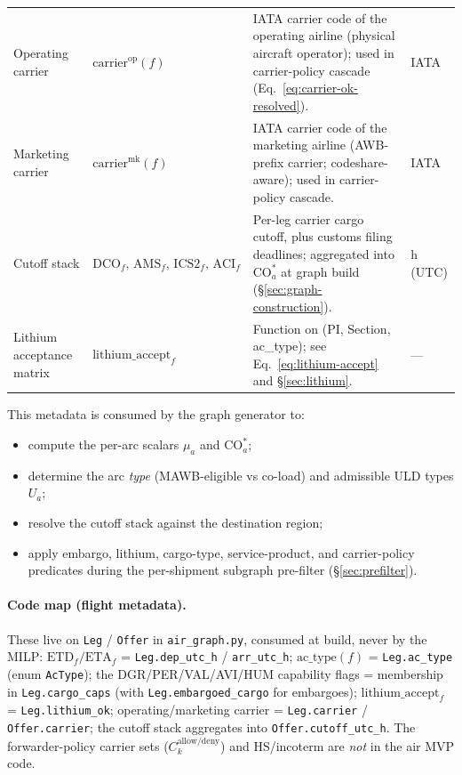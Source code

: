\documentclass[11pt,a4paper]{article}
\theoremstyle{definition}
\begin{document}
\begin{table}[H]
\begin{tabular}{p{2.8cm}p{2.5cm}p{7cm}p{1.5cm}}
Operating carrier & $\text{carrier}^{\text{op}}(f)$ & IATA carrier code of the operating airline (physical aircraft operator); used in carrier-policy cascade (Eq.~\ref{eq:carrier-ok-resolved}). & IATA \\
Marketing carrier & $\text{carrier}^{\text{mk}}(f)$ & IATA carrier code of the marketing airline (AWB-prefix carrier; codeshare-aware); used in carrier-policy cascade. & IATA \\
Cutoff stack & $\text{DCO}_f,\, \text{AMS}_f,\, \text{ICS2}_f,\, \text{ACI}_f$ & Per-leg carrier cargo cutoff, plus customs filing deadlines; aggregated into $\text{CO}_a^*$ at graph build (\S\ref{sec:graph-construction}). & h (UTC) \\
Lithium acceptance matrix & $\text{lithium\_accept}_f$ & Function on (PI, Section, ac\_type); see Eq.~\ref{eq:lithium-accept} and \S\ref{sec:lithium}. & --- \\
\bottomrule
\end{tabular}
\end{table}
This metadata is consumed by the graph generator to:
\begin{itemize}[noitemsep]
  \item compute the per-arc scalars $\mu_a$ and $\text{CO}_a^*$;
  \item determine the arc \emph{type} (MAWB-eligible vs co-load) and admissible
        ULD types $U_a$;
  \item resolve the cutoff stack against the destination region;
  \item apply embargo, lithium, cargo-type, service-product, and
        carrier-policy predicates during the per-shipment subgraph pre-filter
        (\S\ref{sec:prefilter}).
\end{itemize}

\paragraph{Code map (flight metadata).} These live on \texttt{Leg} / \texttt{Offer} in
\texttt{air\_graph.py}, consumed at build, never by the MILP: $\text{ETD}_f/\text{ETA}_f$ =
\texttt{Leg.dep\_utc\_h} / \texttt{arr\_utc\_h}; $\text{ac\_type}(f)$ = \texttt{Leg.ac\_type}
(enum \texttt{AcType}); the DGR/PER/VAL/AVI/HUM capability flags = membership in
\texttt{Leg.cargo\_caps} (with \texttt{Leg.embargoed\_cargo} for embargoes);
$\text{lithium\_accept}_f$ = \texttt{Leg.lithium\_ok}; operating/marketing carrier =
\texttt{Leg.carrier} / \texttt{Offer.carrier}; the cutoff stack aggregates into
\texttt{Offer.cutoff\_utc\_h}. The forwarder-policy carrier sets ($C_k^{\text{allow/deny}}$) and
HS/incoterm are \emph{not} in the air MVP code.
\end{document}
